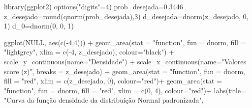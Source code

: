 \documentclass[
]{book}
\newenvironment{Shaded}{\begin{snugshade}}{\end{snugshade}}
\newcommand{\AttributeTok}[1]{\textcolor[rgb]{0.77,0.63,0.00}{#1}}
\newcommand{\ConstantTok}[1]{\textcolor[rgb]{0.00,0.00,0.00}{#1}}
\newcommand{\DecValTok}[1]{\textcolor[rgb]{0.00,0.00,0.81}{#1}}
\newcommand{\FloatTok}[1]{\textcolor[rgb]{0.00,0.00,0.81}{#1}}
\newcommand{\FunctionTok}[1]{\textcolor[rgb]{0.00,0.00,0.00}{#1}}
\newcommand{\NormalTok}[1]{#1}
\newcommand{\OtherTok}[1]{\textcolor[rgb]{0.56,0.35,0.01}{#1}}
\newcommand{\SpecialCharTok}[1]{\textcolor[rgb]{0.00,0.00,0.00}{#1}}
\newcommand{\StringTok}[1]{\textcolor[rgb]{0.31,0.60,0.02}{#1}}
\begin{document}
\begin{Shaded}
\begin{Highlighting}[]
\FunctionTok{library}\NormalTok{(ggplot2)}
\FunctionTok{options}\NormalTok{(}\StringTok{"digits"}\OtherTok{=}\DecValTok{4}\NormalTok{)}
\NormalTok{prob\_desejada}\OtherTok{=}\FloatTok{0.3446}
\NormalTok{z\_desejado}\OtherTok{=}\FunctionTok{round}\NormalTok{(}\FunctionTok{qnorm}\NormalTok{(prob\_desejada),}\DecValTok{3}\NormalTok{)}
\NormalTok{d\_desejada}\OtherTok{=}\FunctionTok{dnorm}\NormalTok{(z\_desejado, }\DecValTok{0}\NormalTok{, }\DecValTok{1}\NormalTok{)}
\NormalTok{d\_0}\OtherTok{=}\FunctionTok{dnorm}\NormalTok{(}\DecValTok{0}\NormalTok{, }\DecValTok{0}\NormalTok{, }\DecValTok{1}\NormalTok{)}

\FunctionTok{ggplot}\NormalTok{(}\ConstantTok{NULL}\NormalTok{, }\FunctionTok{aes}\NormalTok{(}\FunctionTok{c}\NormalTok{(}\SpecialCharTok{{-}}\DecValTok{4}\NormalTok{,}\DecValTok{4}\NormalTok{))) }\SpecialCharTok{+}
  \FunctionTok{geom\_area}\NormalTok{(}\AttributeTok{stat =} \StringTok{"function"}\NormalTok{, }
            \AttributeTok{fun =}\NormalTok{ dnorm, }
            \AttributeTok{fill =} \StringTok{"lightgrey"}\NormalTok{, }
            \AttributeTok{xlim =} \FunctionTok{c}\NormalTok{(}\SpecialCharTok{{-}}\DecValTok{4}\NormalTok{, z\_desejado),}
            \AttributeTok{colour=}\StringTok{"black"}\NormalTok{) }\SpecialCharTok{+}
  \FunctionTok{scale\_y\_continuous}\NormalTok{(}\AttributeTok{name=}\StringTok{"Densidade"}\NormalTok{) }\SpecialCharTok{+}
  \FunctionTok{scale\_x\_continuous}\NormalTok{(}\AttributeTok{name=}\StringTok{"Valores score (z)"}\NormalTok{, }\AttributeTok{breaks =}\NormalTok{ z\_desejado) }\SpecialCharTok{+} 
  \FunctionTok{geom\_area}\NormalTok{(}\AttributeTok{stat =} \StringTok{"function"}\NormalTok{,}
            \AttributeTok{fun =}\NormalTok{ dnorm, }
            \AttributeTok{fill =} \StringTok{"red"}\NormalTok{, }
            \AttributeTok{xlim =} \FunctionTok{c}\NormalTok{(z\_desejado, }\DecValTok{0}\NormalTok{),}
            \AttributeTok{colour=}\StringTok{"red"}\NormalTok{)}\SpecialCharTok{+}
  \FunctionTok{geom\_area}\NormalTok{(}\AttributeTok{stat =} \StringTok{"function"}\NormalTok{,}
            \AttributeTok{fun =}\NormalTok{ dnorm, }
            \AttributeTok{fill =} \StringTok{"red"}\NormalTok{, }
            \AttributeTok{xlim =} \FunctionTok{c}\NormalTok{(}\DecValTok{0}\NormalTok{, }\DecValTok{4}\NormalTok{),}
            \AttributeTok{colour=}\StringTok{"red"}\NormalTok{)}\SpecialCharTok{+}
  \FunctionTok{labs}\NormalTok{(}\AttributeTok{title=} 
      \StringTok{"Curva da função densidade da distribuição Normal padronizada"}\NormalTok{, }

\end{Highlighting}
\end{Shaded}
\end{document}
